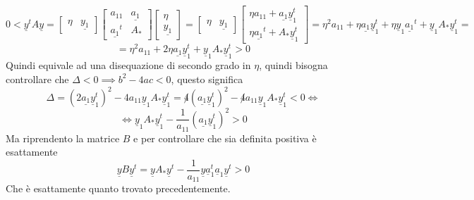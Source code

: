 \begin{nota}
    \begin{equation*}
        0<\underline{y}^t A \underline{y} = \left[\begin{array}{cc}
            \eta & \underline{y_1}
        \end{array}\right]\left[\begin{array}{c|ccc}
            a_{11}&\underline{a_1}\\
            \hline
            \underline{a_1}^t & A_\ast
        \end{array}\right]\left[\begin{array}{c}
            \eta \\
            \underline{y_1}
        \end{array}\right] = \left[\begin{array}{cc}
            \eta & \underline{y_1}
        \end{array}\right]\left[\begin{array}{c}
            \eta a_{11}+\underline{a_1}\underline{y}_1^t\\
            \eta\underline{a_1}^t + A_\ast \underline{y}_1^t
        \end{array}\right] = 
        \eta^2 a_{11}+\eta\underline{a_1}\underline{y}_1^t+\eta
        \underline{y}_1\underline{a_1}^t + \underline{y}_1 A_\ast \underline{y}_1^t = 
    \end{equation*}
    \begin{equation*}
        =\eta^2 a_{11}+2\eta\underline{a_1}\underline{y}_1^t + \underline{y}_1 A_\ast \underline{y}_1^t>0
    \end{equation*}
    Quindi equivale ad una disequazione di secondo grado in $\eta$, quindi bisogna controllare 
    che $\Delta < 0\implies b^2-4ac<0$, questo significa 
    \begin{equation*}
        \Delta =(2\underline{a_1}\underline{y}_1^t)^2 -4a_{11} \underline{y}_1 A_\ast \underline{y}_1^t = \not 4(\underline{a_1}\underline{y}_1^t)^2 -\not 4 a_{11} \underline{y}_1 A_\ast \underline{y}_1^t < 0\iff
    \end{equation*}
    \begin{equation*}
        \iff \underline{y}_1 A_\ast \underline{y}_1^t - \frac{1}{a_{11}} (\underline{a_1}\underline{y}_1^t)^2>0
    \end{equation*}
    Ma riprendento la matrice $B$ e per controllare che sia definita positiva è
    esattamente
    \begin{equation*}
        \underline{y}B\underline{y}^t=\underline{y}A_\ast\underline{y}^t - \frac{1}{a_{11}} \underline{y}\underline{a}_1^t \underline{a}_1\underline{y}^t >0
    \end{equation*}
    Che è esattamente quanto trovato precedentemente.
\end{nota}